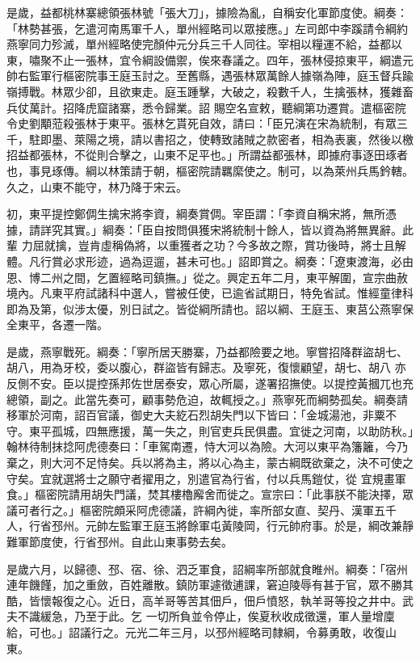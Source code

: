 \begin{pinyinscope}
 是歲，益都桃林寨總領張林號「張大刀」，據險為亂，自稱安化軍節度使。綱奏：「林勢甚張，乞遣河南馬軍千人，單州經略司以眾接應。」左司郎中李蹊請令綱約燕寧同力殄滅，單州經略使完顏仲元分兵三千人同往。宰相以糧運不給，益都以東，嘯聚不止一張林，宜令綱設備禦，俟來春議之。四年，張林侵掠東平，綱遣元帥右監軍行樞密院事王庭玉討之。至舊縣，遇張林眾萬餘人據嶺為陣，庭玉督兵踰嶺搏戰。林眾少卻，且欲東走。庭玉踵擊，大破之，殺數千人，生擒張林，獲雜畜兵仗萬計。招降虎窟諸寨，悉令歸業。詔
 賜空名宣敕，聽綱第功遷賞。遣樞密院令史劉顒蒞殺張林于東平。張林乞貰死自效，請曰：「臣兄演在宋為統制，有眾三千，駐即墨、萊陽之境，請以書招之，使轉致諸賊之款密者，相為表裏，然後以檄招益都張林，不從則合擊之，山東不足平也。」所謂益都張林，即據府事逐田琢者也，事見琢傳。綱以林策請于朝，樞密院請羈縻使之。制可，以為萊州兵馬鈐轄。久之，山東不能守，林乃降于宋云。



 初，東平提控鄭倜生擒宋將李資，綱奏賞倜。宰臣謂：「李資自稱宋將，無所憑據，請詳究其實。」綱奏：「臣自按問俱獲宋將統制十餘人，皆以資為將無異辭。此輩
 力屈就擒，豈肯虛稱偽將，以重獲者之功？今多故之際，賞功後時，將士且解體。凡行賞必求形迹，過為逗遛，甚未可也。」詔即賞之。綱奏：「遼東渡海，必由恩、博二州之間，乞置經略司鎮撫。」從之。興定五年二月，東平解圍，宣宗曲赦境內。凡東平府試諸科中選人，嘗被任使，已逾省試期日，特免省試。惟經童律科即為及第，似涉太優，別日試之。皆從綱所請也。詔以綱、王庭玉、東莒公燕寧保全東平，各遷一階。



 是歲，燕寧戰死。綱奏：「寧所居天勝寨，乃益都險要之地。寧嘗招降群盜胡七、胡八，用為牙校，委以腹心，群盜皆有歸志。及寧死，復懷顧望，胡七、胡八
 亦反側不安。臣以提控孫邦佐世居泰安，眾心所屬，遂署招撫使。以提控黃摑兀也充總領，副之。此當先奏可，顧事勢危迫，故輒授之。」燕寧死而綱勢孤矣。綱奏請移軍於河南，詔百官議，御史大夫紇石烈胡失門以下皆曰：「金城湯池，非粟不守。東平孤城，四無應援，萬一失之，則官吏兵民俱盡。宜徙之河南，以助防秋。」翰林待制抹捻阿虎德奏曰：「車駕南遷，恃大河以為險。大河以東平為籓籬，今乃棄之，則大河不足恃矣。兵以將為主，將以心為主，蒙古綱既欲棄之，決不可使之守矣。宜就選將士之願守者擢用之，別遣官為行省，付以兵馬鎧仗，從
 宜規畫軍食。」樞密院請用胡失門議，焚其樓櫓廨舍而徙之。宣宗曰：「此事朕不能決擇，眾議可者行之。」樞密院頗采阿虎德議，許綱內徙，率所部女直、契丹、漢軍五千人，行省邳州。元帥左監軍王庭玉將餘軍屯黃陵岡，行元帥府事。於是，綱改兼靜難軍節度使，行省邳州。自此山東事勢去矣。



 是歲六月，以歸德、邳、宿、徐、泗乏軍食，詔綱率所部就食睢州。綱奏：「宿州連年饑饉，加之重斂，百姓離散。鎮防軍遽徵逋課，窘迫陵辱有甚于官，眾不勝其酷，皆懷報復之心。近日，高羊哥等苦其佃戶，佃戶憤怒，執羊哥等投之井中。武夫不識緩急，乃至于此。乞
 一切所負並令停止，俟夏秋收成徵還，軍人量增廩給，可也。」詔議行之。元光二年三月，以邳州經略司隸綱，令募勇敢，收復山東。




\end{pinyinscope}

